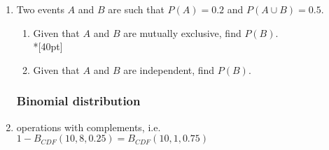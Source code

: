 \documentclass[12pt, oneside]{article}
\begin{document}
\begin{enumerate}
\item Two events $A$ and $B$ are such that $P(A)=0.2$ and $P(A \cup B) =0.5$. 
\begin{enumerate}
    \item Given that $A$ and $B$ are mutually exclusive, find $P(B)$.\\*[40pt]
    \item Given that $A$ and $B$ are independent, find $P(B)$.
\end{enumerate}

\newpage
\subsubsection*{Binomial distribution}
\item operations with complements, i.e. $1-B_{CDF}(10,8,0.25)=B_{CDF}(10,1,0.75)$


\end{enumerate}
\end{document}
